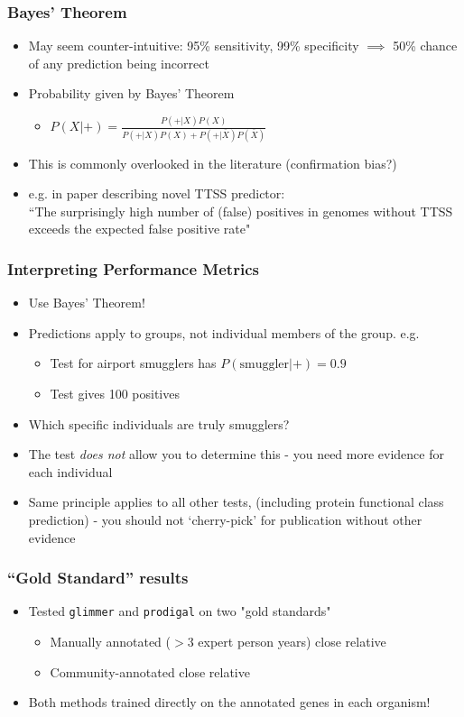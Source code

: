 \begin{frame}
  \frametitle{Bayes' Theorem}
  \begin{itemize}
    \item May seem counter-intuitive: 95\% sensitivity, 99\% specificity $\implies$ 50\% chance of any prediction being incorrect
    \item Probability given by Bayes' Theorem
    \begin{itemize}
      \item $P(X|+) =  \frac{P(+|X) P(X)}{P(+|X) P(X) + P(+|\bar{X}) P(\bar{X})}$
    \end{itemize}
    \item This is commonly overlooked in the literature (confirmation bias?)
    \item e.g. in paper describing novel TTSS predictor: \\
      ``The surprisingly high number of (false) positives in genomes without TTSS exceeds the expected false positive rate"
  \end{itemize} 
\end{frame}

\begin{frame}
  \frametitle{Interpreting Performance Metrics}
  \begin{itemize}
    \item<1-> Use Bayes' Theorem!
    \item<1-> Predictions apply to groups, not individual members of the group. e.g.
    \begin{itemize}
      \item Test for airport smugglers has $P(\text{smuggler}|+) = 0.9$
      \item Test gives 100 positives
    \end{itemize}
    \item<1-> Which specific individuals are truly smugglers?
    \item<2-> The test \emph{does not} allow you to determine this - you need more evidence for each individual
    \item<2->  Same principle applies to all other tests, (including protein functional class prediction) - you should not `cherry-pick' for publication without other evidence
  \end{itemize} 
\end{frame}

\begin{frame}
  \frametitle{``Gold Standard'' results}
  \begin{itemize}
    \item Tested \texttt{glimmer} and \texttt{prodigal} on two "gold standards"
    \begin{itemize}
      \item Manually annotated ($>$3 expert person years) close relative
      \item Community-annotated close relative
    \end{itemize}
    \item Both methods trained directly on the annotated genes in each organism!
  \end{itemize} 
\end{frame}

